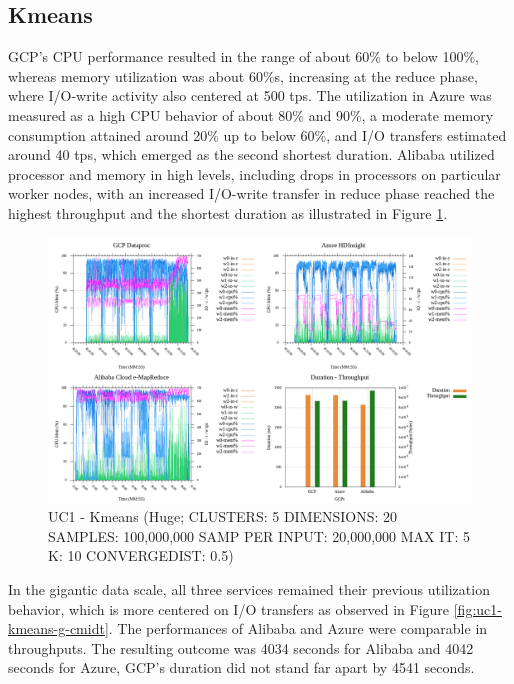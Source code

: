 \documentclass[review]{elsarticle}
\begin{document}
\subsection{Kmeans}
GCP's CPU performance resulted in the range of about 60\% to below 100\%, whereas memory utilization was about 60\%s, increasing at the reduce phase, where I/O-write activity also centered at 500 tps. The utilization in Azure was measured as a high CPU behavior of about 80\% and 90\%, a moderate memory consumption attained  around 20\% up to below 60\%, and I/O transfers estimated around 40 tps, which emerged as the second shortest duration. Alibaba utilized processor and memory in high levels, including drops in processors on particular worker nodes, with an increased I/O-write transfer in reduce phase reached the highest throughput and the shortest duration as illustrated in Figure \ref{fig:uc1-kmeans-h-cmidt}.

\begin{figure}[p]
	\caption{UC1 - Kmeans (Huge; CLUSTERS: 5 DIMENSIONS: 20 SAMPLES: 100,000,000 SAMP PER INPUT: 20,000,000 MAX IT: 5 K: 10 CONVERGEDIST: 0.5)}
	\label{fig:uc1-kmeans-h-cmidt}
	\includegraphics[width=\textwidth]{uc1-kmeans-h-cmidt}
	\centering
\end{figure}

In the gigantic data scale, all three services remained their previous utilization behavior, which is more centered on I/O transfers as observed in Figure \ref{fig:uc1-kmeans-g-cmidt}. The performances of Alibaba and Azure were comparable in throughputs. The resulting outcome was 4034 seconds for Alibaba and 4042 seconds for Azure, GCP's duration did not stand far apart by 4541 seconds.
\end{document}
